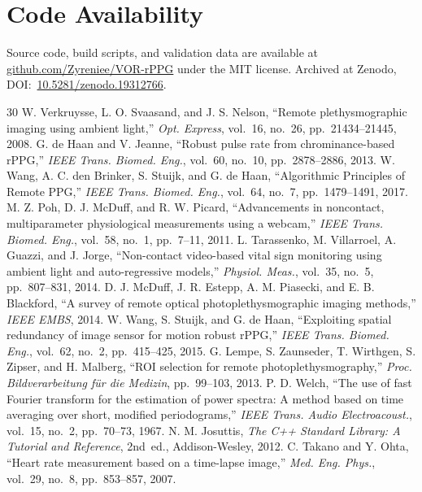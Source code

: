 \documentclass[9pt,technote,twocolumn,compsoc]{article}
\begin{document}
\section*{Code Availability}
Source code, build scripts, and validation data are available at \href{https://github.com/Zyreniee/VOR-rPPG}{github.com/Zyreniee/VOR-rPPG} under the MIT license. Archived at Zenodo, DOI:~\href{https://doi.org/10.5281/zenodo.19312766}{10.5281/zenodo.19312766}.

\begin{thebibliography}{30}
\scriptsize
{} W. Verkruysse, L. O. Svaasand, and J. S. Nelson, ``Remote plethysmographic imaging using ambient light,'' \textit{Opt. Express}, vol.~16, no.~26, pp.~21434--21445, 2008.
 G. de Haan and V. Jeanne, ``Robust pulse rate from chrominance-based rPPG,'' \textit{IEEE Trans. Biomed. Eng.}, vol.~60, no.~10, pp.~2878--2886, 2013.
 W. Wang, A. C. den Brinker, S. Stuijk, and G. de Haan, ``Algorithmic Principles of Remote PPG,'' \textit{IEEE Trans. Biomed. Eng.}, vol.~64, no.~7, pp.~1479--1491, 2017.
 M. Z. Poh, D. J. McDuff, and R. W. Picard, ``Advancements in noncontact, multiparameter physiological measurements using a webcam,'' \textit{IEEE Trans. Biomed. Eng.}, vol.~58, no.~1, pp.~7--11, 2011.
 L. Tarassenko, M. Villarroel, A. Guazzi, and J. Jorge, ``Non-contact video-based vital sign monitoring using ambient light and auto-regressive models,'' \textit{Physiol. Meas.}, vol.~35, no.~5, pp.~807--831, 2014.
 D. J. McDuff, J. R. Estepp, A. M. Piasecki, and E. B. Blackford, ``A survey of remote optical photoplethysmographic imaging methods,'' \textit{IEEE EMBS}, 2014.
 W. Wang, S. Stuijk, and G. de Haan, ``Exploiting spatial redundancy of image sensor for motion robust rPPG,'' \textit{IEEE Trans. Biomed. Eng.}, vol.~62, no.~2, pp.~415--425, 2015.
 G. Lempe, S. Zaunseder, T. Wirthgen, S. Zipser, and H. Malberg, ``ROI selection for remote photoplethysmography,'' \textit{Proc. Bildverarbeitung f\"ur die Medizin}, pp.~99--103, 2013.
 P. D. Welch, ``The use of fast Fourier transform for the estimation of power spectra: A method based on time averaging over short, modified periodograms,'' \textit{IEEE Trans. Audio Electroacoust.}, vol.~15, no.~2, pp.~70--73, 1967.
 N. M. Josuttis, \textit{The C++ Standard Library: A Tutorial and Reference}, 2nd~ed., Addison-Wesley, 2012.
 C. Takano and Y. Ohta, ``Heart rate measurement based on a time-lapse image,'' \textit{Med. Eng. Phys.}, vol.~29, no.~8, pp.~853--857, 2007.

\end{thebibliography}
\end{document}
